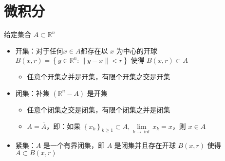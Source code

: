 


\newcommand\Title{智能计算数学基础笔记}
\renewcommand\due{due: November 6, 2022}
\newcommand\dom{\operatorname{dom}} %
\newcommand\diag{\operatorname{diag}} %
\newcommand\epi{\operatorname{epi}} %
\newcommand\minimize{\operatorname{minimize}} %
\newcommand\maximize{\operatorname{maximize}} %
\newcommand\subject{\operatorname{subject\ to}}





\section{微积分}
\begin{remark}
    给定集合 $A \subset \mathbb{R}^n$\begin{itemize}
        \item 开集：对于任何$x \in A$都存在以 $x$ 为中心的开球 $B(x, r) = \left\{y \in \mathbb{R}^n: \|y - x\| < r\right\}$ 使得 $B(x, r) \subset A$\begin{itemize}
            \item 任意个开集之并是开集，有限个开集之交是开集
        \end{itemize}
        \item 闭集：补集 $(\mathbb{R}^n - A)$ 是开集\begin{itemize}
            \item 任意个闭集之交是闭集，有限个闭集之并是闭集
            \item $A = \bar{A}$，即：如果 $\left\{x_k\right\}_{k \ge 1} \subset A,\underset{k \to \inf}{\lim}x_k = x$，则 $x \in A$
        \end{itemize}
        \item  紧集：$A$ 是一个有界闭集，即 $A$ 是闭集并且存在开球 $B(x, r)$ 使得 $A \subset B(x, r)$
    \end{itemize}
\end{remark}

